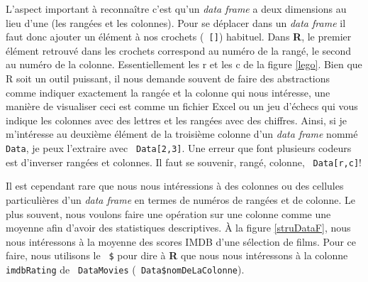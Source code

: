\documentclass[10.5pt,a4paper]{article}
\newcommand{\rcode}[1]{\texttt{\color{rstudio} #1}}
\begin{document}
    
    L'aspect important à reconnaître c'est qu'un \emph{data frame} a deux dimensions au lieu d'une (les rangées et les colonnes). Pour se déplacer dans un \emph{data frame} il faut donc ajouter un élément à nos crochets (\rcode{[]}) habituel. Dans \textbf{R}, le premier élément retrouvé dans les crochets correspond au numéro de la rangé, le second au numéro de la colonne. Essentiellement les r et les c de la figure \ref{lego}. Bien que R soit un outil puissant, il nous demande souvent de faire des abstractions comme indiquer exactement la rangée et la colonne qui nous intéresse, une manière de visualiser ceci est comme un fichier Excel ou un jeu d'échecs qui vous indique les colonnes avec des lettres et les rangées avec des chiffres. Ainsi, si je m'intéresse au deuxième élément de la troisième colonne d'un \emph{data frame} nommé \rcode{Data}, je peux l'extraire avec \rcode{Data[2,3]}. Une erreur que font plusieurs codeurs est d'inverser rangées et colonnes. Il faut se souvenir, rangé, colonne, \rcode{Data[r,c]}!
    
    Il est cependant rare que nous nous intéressions à des colonnes ou des cellules particulières d'un \emph{data frame} en termes de numéros de rangées et de colonne. Le plus souvent, nous voulons faire une opération sur une colonne comme une moyenne afin d'avoir des statistiques descriptives. À la figure \ref{struDataF}, nous nous intéressons à la moyenne des scores IMDB d'une sélection de films. Pour ce faire, nous utilisons le \rcode{\$} pour dire à \textbf{R} que nous nous intéressons à la colonne \rcode{imdbRating} de \rcode{DataMovies} (\rcode{Data\$nomDeLaColonne}).
    
\end{document}
